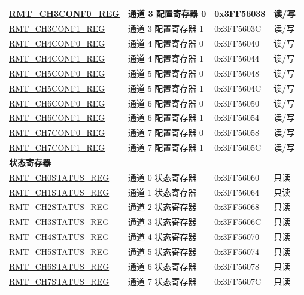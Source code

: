 \begin{longtable}{|p{5cm}|p{6.8cm} | p{2cm} | p{1.2cm} | }
\hyperref[regdesc:RMTCHnCONF0REG]{RMT\_CH3CONF0\_REG} & 通道 3 配置寄存器 0 & 0x3FF56038 & 读/写 \\ \hline
\hyperref[regdesc:RMTCHnCONF1REG]{RMT\_CH3CONF1\_REG} & 通道 3 配置寄存器 1 & 0x3FF5603C & 读/写 \\ \hline
\hyperref[regdesc:RMTCHnCONF0REG]{RMT\_CH4CONF0\_REG} & 通道 4 配置寄存器 0 & 0x3FF56040 & 读/写 \\ \hline
\hyperref[regdesc:RMTCHnCONF1REG]{RMT\_CH4CONF1\_REG} & 通道 4 配置寄存器 1 & 0x3FF56044 & 读/写 \\ \hline
\hyperref[regdesc:RMTCHnCONF0REG]{RMT\_CH5CONF0\_REG} & 通道 5 配置寄存器 0 & 0x3FF56048 & 读/写 \\ \hline
\hyperref[regdesc:RMTCHnCONF1REG]{RMT\_CH5CONF1\_REG} & 通道 5 配置寄存器 1 & 0x3FF5604C & 读/写 \\ \hline
\hyperref[regdesc:RMTCHnCONF0REG]{RMT\_CH6CONF0\_REG} & 通道 6 配置寄存器 0 & 0x3FF56050 & 读/写 \\ \hline
\hyperref[regdesc:RMTCHnCONF1REG]{RMT\_CH6CONF1\_REG} & 通道 6 配置寄存器 1 & 0x3FF56054 & 读/写 \\ \hline
\hyperref[regdesc:RMTCHnCONF0REG]{RMT\_CH7CONF0\_REG} & 通道 7 配置寄存器 0 & 0x3FF56058 & 读/写 \\ \hline
\hyperref[regdesc:RMTCHnCONF1REG]{RMT\_CH7CONF1\_REG} & 通道 7 配置寄存器 1 & 0x3FF5605C & 读/写 \\ \hline
\multicolumn{4}{|l|}{\textbf{状态寄存器}} \\ \hline
\hyperref[regdesc:RMTCHnSTATUSREG]{RMT\_CH0STATUS\_REG} & 通道 0 状态寄存器 & 0x3FF56060 & 只读 \\ \hline
\hyperref[regdesc:RMTCHnSTATUSREG]{RMT\_CH1STATUS\_REG} & 通道 1 状态寄存器 & 0x3FF56064 & 只读 \\ \hline
\hyperref[regdesc:RMTCHnSTATUSREG]{RMT\_CH2STATUS\_REG} & 通道 2 状态寄存器 & 0x3FF56068 & 只读 \\ \hline
\hyperref[regdesc:RMTCHnSTATUSREG]{RMT\_CH3STATUS\_REG} & 通道 3 状态寄存器 & 0x3FF5606C & 只读 \\ \hline
\hyperref[regdesc:RMTCHnSTATUSREG]{RMT\_CH4STATUS\_REG} & 通道 4 状态寄存器 & 0x3FF56070 & 只读 \\ \hline
\hyperref[regdesc:RMTCHnSTATUSREG]{RMT\_CH5STATUS\_REG} & 通道 5 状态寄存器 & 0x3FF56074 & 只读 \\ \hline
\hyperref[regdesc:RMTCHnSTATUSREG]{RMT\_CH6STATUS\_REG} & 通道 6 状态寄存器 & 0x3FF56078 & 只读 \\ \hline
\hyperref[regdesc:RMTCHnSTATUSREG]{RMT\_CH7STATUS\_REG} & 通道 7 状态寄存器 & 0x3FF5607C & 只读 \\ \hline

\end{longtable}
